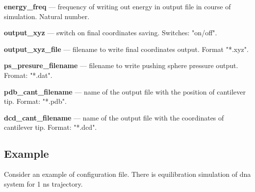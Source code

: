 \documentclass[12pt,a4paper]{article}
\begin{document}
{\bf energy\_freq} --- frequency of writing out energy in output file in course of simulation. Natural number.

{\bf output\_xyz} --- switch on final coordinates saving. Switches: "on/off".

{\bf output\_xyz\_file} --- filename to write final coordinates output. Format "*.xyz".

{\bf ps\_presure\_filename} --- filename to write pushing sphere pressure output. Fromat: "*.dat".

{\bf pdb\_cant\_filename} --- name of the output file with the position of cantilever tip. Format: "*.pdb".

{\bf dcd\_cant\_filename} --- name of the output file with the coordinates of cantilever tip. Format: "*.dcd".

\subsection{Example}

Consider an example of configuration file. There is equilibration simulation of dna system for 1 ns trajectory.
\end{document}
